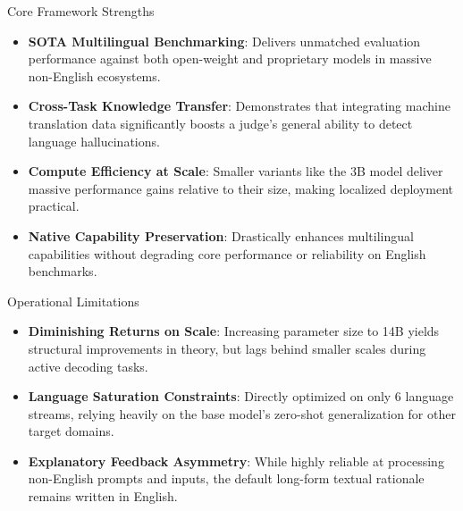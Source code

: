 \documentclass[10pt]{beamer}
\begin{document}

\begin{frame}{Core Framework Strengths}
  \begin{itemize}
    \item \textbf{SOTA Multilingual Benchmarking}: Delivers unmatched evaluation performance against both open-weight and proprietary models in massive non-English ecosystems.
    \item \textbf{Cross-Task Knowledge Transfer}: Demonstrates that integrating machine translation data significantly boosts a judge's general ability to detect language hallucinations.
    \item \textbf{Compute Efficiency at Scale}: Smaller variants like the 3B model deliver massive performance gains relative to their size, making localized deployment practical.
    \item \textbf{Native Capability Preservation}: Drastically enhances multilingual capabilities without degrading core performance or reliability on English benchmarks.
  \end{itemize}
\end{frame}

\begin{frame}{Operational Limitations}
  \begin{itemize}
    \item \textbf{Diminishing Returns on Scale}: Increasing parameter size to 14B yields structural improvements in theory, but lags behind smaller scales during active decoding tasks.
    \item \textbf{Language Saturation Constraints}: Directly optimized on only 6 language streams, relying heavily on the base model's zero-shot generalization for other target domains.
    \item \textbf{Explanatory Feedback Asymmetry}: While highly reliable at processing non-English prompts and inputs, the default long-form textual rationale remains written in English.
  \end{itemize}
\end{frame}
\end{document}
